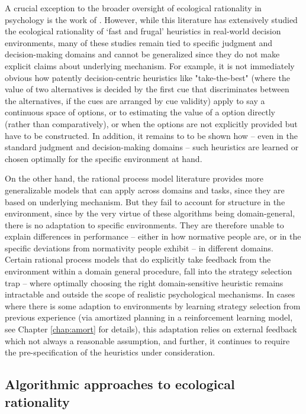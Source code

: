 A crucial exception to the broader oversight of ecological rationality in psychology is the work of \citep{gigerenzer2008heuristics}. However, while this literature has extensively studied the ecological rationality of `fast and frugal' heuristics in real-world decision environments, many of these studies remain tied to specific judgment and decision-making domains and cannot be generalized since they do not make explicit claims about underlying mechanism. For example, it is not immediately obvious how patently decision-centric heuristics like "take-the-best" (where the value of two alternatives is decided by the first cue that discriminates between the alternatives, if the cues are arranged by cue validity) apply to say a continuous space of options, or to estimating the value of a option directly (rather than comparatively), or when the options are not explicitly provided but have to be constructed. In addition, it remains to to be shown how -- even in the standard judgment and decision-making domains -- such heuristics are learned or chosen optimally for the specific environment at hand. 

On the other hand, the rational process model literature provides more generalizable models that can apply across domains and tasks, since they are based on underlying mechanism. But they fail to account for structure in the environment, since by the very virtue of these algorithms being domain-general, there is no adaptation to specific environments. They are therefore unable to explain differences in performance -- either in how normative people are, or in the specific deviations from normativity people exhibit -- in different domains. Certain rational process models that do explicitly take feedback from the environment within a domain general procedure, fall into the strategy selection trap -- where optimally choosing the right domain-sensitive heuristic remains intractable and outside the scope of realistic psychological mechanisms. In cases where there is some adaption to environments by learning strategy selection from previous experience (via amortized planning in a reinforcement learning model, see Chapter \ref{chap:amort} for details), this adaptation relies on external feedback which not always a reasonable assumption, and further, it continues to require the pre-specification of the heuristics under consideration.

\subsection{Algorithmic approaches to ecological rationality}

